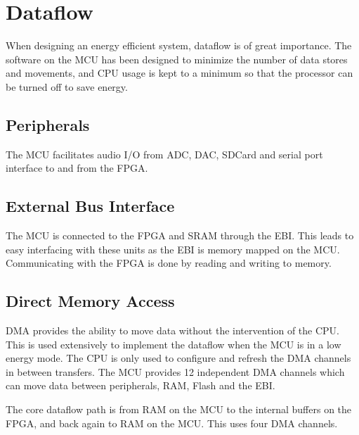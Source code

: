 
\section{Dataflow}

When designing an energy efficient system, dataflow is of great
importance. The software on the MCU has been designed to
minimize the number of data stores and movements, and CPU usage
is kept to a minimum so that the processor can be turned off to
save energy. 

\subsection{Peripherals} The MCU facilitates audio I/O from ADC,
DAC, SDCard and serial port interface to and from the FPGA.

\subsection{External Bus Interface} The MCU is connected to the
FPGA and SRAM through the EBI. This leads to easy interfacing
with these units as the EBI is memory mapped on the MCU.
Communicating with the FPGA is done by reading and writing to
memory.


\subsection{Direct Memory Access} DMA provides the ability to
move data without the intervention of the CPU. This is used
extensively to implement the dataflow when the MCU is in a low
energy mode. The CPU is only used to configure and refresh the
DMA channels in between transfers. The MCU provides 12
independent DMA channels which can move data between
peripherals, RAM, Flash and the EBI.

The core dataflow path is from RAM on the MCU to the internal
buffers on the FPGA, and back again to RAM on the MCU. This uses
four DMA channels. 

